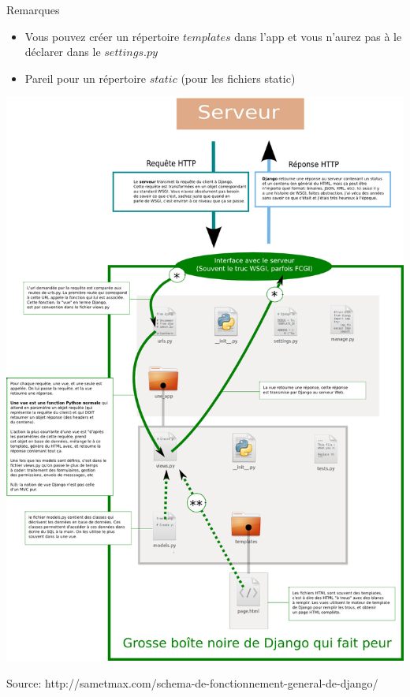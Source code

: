 \documentclass{beamer}
\begin{document}
\begin{frame}[fragile]{Remarques}
    \begin{itemize}
        \item Vous pouvez créer un répertoire $templates$ dans l'app et vous n'aurez pas à le déclarer dans le $settings.py$
        \item Pareil pour un répertoire $static$ (pour les fichiers static)
    \end{itemize}
\end{frame}

\begin{frame}[fragile]{}
\begin{center}
    \includegraphics[scale=.18]{django.png}

    \footnotesize Source: http://sametmax.com/schema-de-fonctionnement-general-de-django/
\end{center}
\end{frame}
\end{document}
